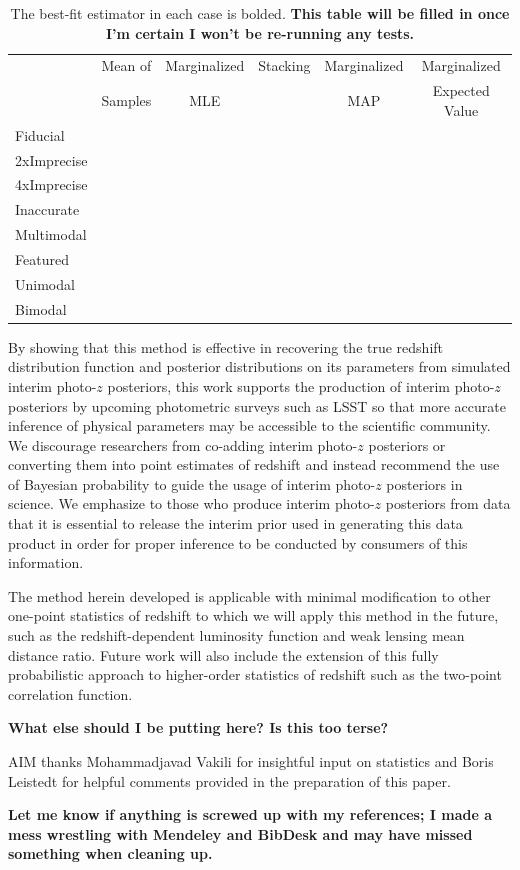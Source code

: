 \documentclass[preprint]{aastex}
\begin{document}
\begin{table}
\begin{tabular}{lccccc}
& Mean of & Marginalized & Stacking & Marginalized & Marginalized\\
& Samples & MLE & & MAP & Expected Value\\
Fiducial &&&&&\\
2xImprecise &&&&&\\
4xImprecise &&&&&\\
Inaccurate &&&&&\\
Multimodal &&&&&\\
Featured &&&&&\\
Unimodal &&&&&\\
Bimodal &&&&&
\end{tabular}
\caption{The best-fit estimator in each case is bolded.  \textbf{This table 
will be filled in once I'm certain I won't be re-running any tests.}}
\label{tab:kld}
\end{table}

By showing that this method is effective in recovering the true redshift 
distribution function and posterior distributions on its parameters from 
simulated interim photo-$z$ posteriors, this work supports the production of 
interim photo-$z$ posteriors by upcoming photometric surveys such as LSST so 
that more accurate inference of physical parameters may be accessible to the 
scientific community.  We discourage researchers from co-adding interim 
photo-$z$ posteriors or converting them into point estimates of redshift and 
instead recommend the use of Bayesian probability to guide the usage of interim 
photo-$z$ posteriors in science.  We emphasize to those who produce interim 
photo-$z$ posteriors from data that it is essential to release the interim 
prior used in generating this data product in order for proper inference to be 
conducted by consumers of this information.

The method herein developed is applicable with minimal modification to other 
one-point statistics of redshift to which we will apply this method in the 
future, such as the redshift-dependent luminosity function and weak lensing 
mean distance ratio.  Future work will also include the extension of this fully 
probabilistic approach to higher-order statistics of redshift such as the 
two-point correlation function.

\textbf{What else should I be putting here?  Is this too terse?}


\begin{acknowledgements}
AIM thanks Mohammadjavad Vakili for insightful input on statistics and Boris 
Leistedt for helpful comments provided in the preparation of this paper.
\end{acknowledgements}

\textbf{Let me know if anything is screwed up with my references; I made a mess 
wrestling with Mendeley and BibDesk and may have missed something when cleaning 
up.}


\end{document}
